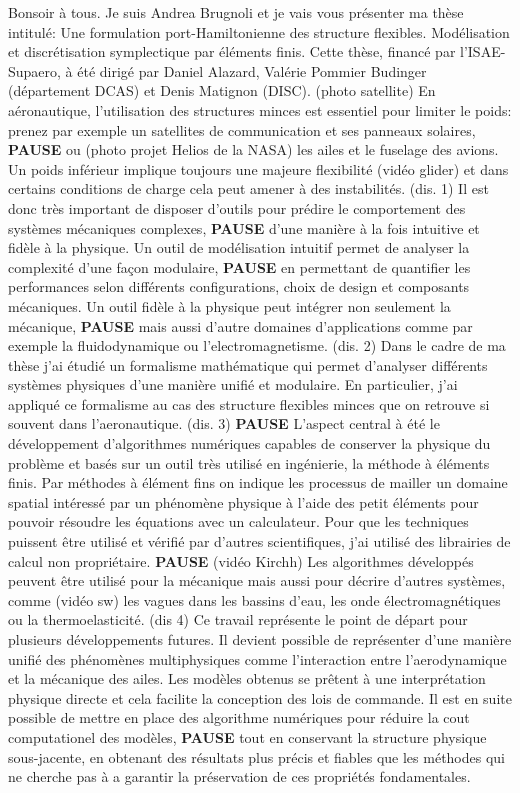 \documentclass[16pt]{article}
\begin{document}
\Large
Bonsoir à tous. Je suis Andrea Brugnoli et je vais vous présenter ma thèse intitulé:
Une formulation port-Hamiltonienne des structure flexibles. Modélisation et discrétisation symplectique par éléments finis. Cette thèse, financé par l'ISAE-Supaero, à été dirigé par Daniel Alazard, Valérie Pommier Budinger (département DCAS) et Denis Matignon (DISC). 
(photo satellite) En aéronautique, l'utilisation des structures minces est essentiel pour limiter le poids: prenez par exemple un satellites de communication et ses panneaux solaires, \textbf{PAUSE} ou (photo projet Helios de la NASA) les ailes et le fuselage des avions. Un poids inférieur implique toujours une majeure flexibilité (vidéo glider) et dans certains conditions de charge cela peut amener à des instabilités. (dis. 1) Il est donc très important de disposer d'outils pour prédire le comportement des systèmes mécaniques complexes, \textbf{PAUSE} d'une manière à la fois intuitive et fidèle à la physique. Un outil de modélisation intuitif permet de analyser la complexité d'une façon modulaire, \textbf{PAUSE} en permettant de quantifier les performances selon différents configurations, choix de design et composants mécaniques. Un outil fidèle à la physique peut intégrer non seulement la mécanique, \textbf{PAUSE} mais aussi d'autre domaines d'applications comme par exemple la fluidodynamique ou l'electromagnetisme. (dis. 2) Dans le cadre de ma thèse j'ai étudié un formalisme mathématique qui permet d'analyser différents systèmes physiques d'une manière unifié et modulaire. En particulier, j'ai appliqué ce formalisme au cas des structure flexibles minces que on retrouve si souvent dans l'aeronautique. (dis. 3)  \textbf{PAUSE} L'aspect central à été le développement d'algorithmes numériques capables de conserver la physique du problème et basés sur un outil très utilisé en ingénierie, la méthode à éléments finis. Par méthodes à élément fins on indique les processus de mailler un domaine spatial intéressé par un phénomène physique à l'aide des petit éléments pour pouvoir résoudre les équations avec un calculateur. Pour que les techniques puissent être utilisé et vérifié par d'autres scientifiques, j'ai utilisé des librairies de calcul non propriétaire. \textbf{PAUSE} (vidéo Kirchh) Les algorithmes développés peuvent être utilisé pour la mécanique mais aussi pour décrire d'autres systèmes, comme (vidéo sw) les vagues dans les bassins d'eau, les onde électromagnétiques ou la thermoelasticité. (dis 4) Ce travail représente le point de départ pour plusieurs développements futures. Il devient possible de représenter d'une manière unifié des phénomènes multiphysiques comme l'interaction entre l'aerodynamique et la mécanique des ailes. Les modèles obtenus se prêtent à une interprétation physique directe et cela facilite la conception des lois de commande. Il est en suite possible de mettre en place des algorithme numériques pour réduire la cout computationel des modèles, \textbf{PAUSE} tout en conservant la structure physique sous-jacente, en obtenant des résultats plus précis et fiables que les méthodes qui ne cherche pas à a garantir la préservation de ces propriétés fondamentales. 
\\
\end{document}
